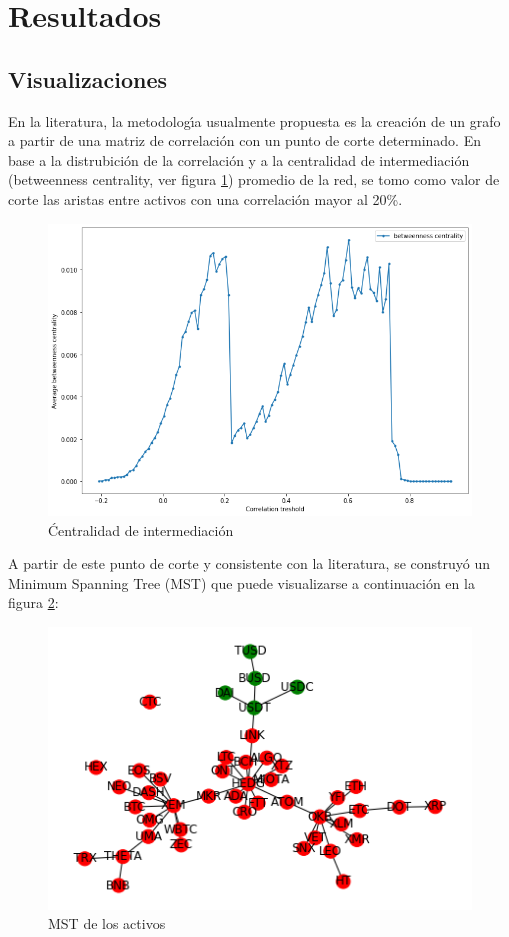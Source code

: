 \documentclass[runningheads,a4paper,10pt]{etc/llncs}
\let\stdsection\section
\renewcommand\section{\newpage\stdsection}
\begin{document}
\section{Resultados}
\subsection{Visualizaciones} 


En la literatura, la metodologı́a usualmente propuesta es la creación de un grafo a partir de una matriz de correlación con un punto de corte determinado.
En base a la distrubición de la correlación y a la centralidad de intermediación (betweenness centrality, ver figura \ref{fig:btw_centrality}) promedio de la red, se tomo como valor de corte las aristas entre activos con una correlación mayor al 20\%.

\begin{figure}[htp]
    \centering
    \includegraphics[scale=0.3]{images/betweeness_centrality.png}
    \caption{Ćentralidad de intermediación}
    \label{fig:btw_centrality}
\end{figure}


A partir de este punto de corte y consistente con la literatura, se construyó un Minimum Spanning Tree (MST) que puede visualizarse a continuación en la figura \ref{fig:mst}:

\begin{figure}[htp]
    \centering
    \includegraphics[scale=1]{images/mst.png}
    \caption{MST de los activos}
    \label{fig:mst}
\end{figure}
\end{document}
